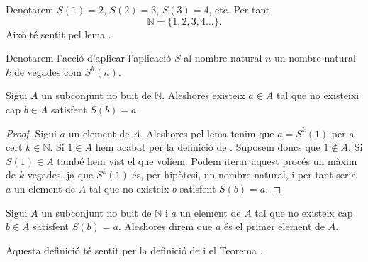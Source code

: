 \documentclass[../../Main.tex]{subfiles}
\begin{document}
	\begin{notation}
		Denotarem \(S(1)=2\), \(S(2)=3\), \(S(3)=4\), etc. Per tant
		\[\mathbb{N}=\{1,2,3,4\dots\}.\]
		Això té sentit pel lema .
	\end{notation}
	\begin{notation}
		Denotarem l'acció d'aplicar l'aplicació \(S\) al nombre natural \(n\) un nombre natural \(k\) de vegades com \(S^{k}(n)\).
	\end{notation}
	\begin{theorem}
		\label{thm:primer element}
		Sigui \(A\) un subconjunt no buit de \(\mathbb{N}\). Aleshores existeix \(a\in A\) tal que no existeixi cap \(b\in A\) satisfent \(S(b)=a\).
		\begin{proof}
			Sigui \(a\) un element de \(A\). Aleshores pel lema  tenim que \(a=S^{k}(1)\) per a cert \(k\in\mathbb{N}\). Si \(1\in A\) hem acabat per la definició de . Suposem doncs que \(1\notin A\). Si \(S(1)\in A\) també hem vist el que volíem. Podem iterar aquest procés un màxim de \(k\) vegades, ja que \(S^{k}(1)\) és, per hipòtesi, un nombre natural, i per tant seria \(a\) un element de \(A\) tal que no existeix \(b\) satisfent \(S(b)=a\).
		\end{proof}
	\end{theorem}
	\begin{definition}
		\label{def:primer element}
		Sigui \(A\) un subconjunt no buit de \(\mathbb{N}\) i \(a\) un element de \(A\) tal que no existeix cap \(b\in A\) satisfent \(S(b)=a\). Aleshores direm que \(a\) és el primer element de \(A\).
		
		Aquesta definició té sentit per la definició de  i el Teorema .
	\end{definition}
\end{document}

